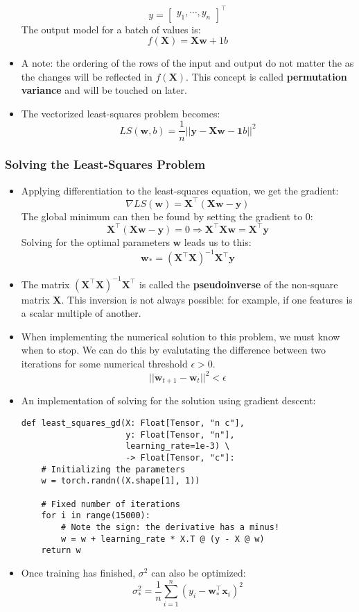 \documentclass{article}
\newcommand{\tbf}[1]{\textbf{#1}}
\newcommand{\mbf}[1]{\mathbf{#1}}
\begin{document}
\begin{itemize}
        \[
        y = 
        \begin{bmatrix}
            y_1, \cdots, y_n
        \end{bmatrix}
        ^{\top}
        \]
        The output model for a batch of values is:
        \[f(\mbf{X})=\mbf{Xw}+1b\] 
        \item A note: the ordering of the rows of the input and output do not matter the as the changes will be reflected in $f(\mbf{X})$. This concept is 
        called \tbf{permutation variance} and will be touched on later.
        \item The vectorized least-squares problem becomes:
        \[LS(\mbf{w},b)=\frac{1}{n}||\mbf{y}-\mbf{Xw}-\mbf{1}b||^2\]
    \end{itemize}
    \subsubsection{Solving the Least-Squares Problem}
    \begin{itemize}
        \item Applying differentiation to the least-squares equation, we get the gradient:
        \[\nabla LS(\mbf{w})=\mbf{X}^{\top}(\mbf{Xw-y})\]
        The global minimum can then be found by setting the gradient to 0:
        \[
            \mbf{X}^{\top}(\mbf{Xw-y}) = 0 \Rightarrow \mbf{X}^{\top}\mbf{Xw} = \mbf{X}^{\top}\mbf{y}
        \]
        Solving for the optimal parameters $\mbf{w}$ leads us to this:
        \[\mbf{w}_*=(\mbf{X}^{\top}\mbf{X})^{-1}\mbf{X^{\top}y}\]
        \item The matrix $\mbf{(X^{\top}X)}^{-1}\mbf{X^{\top}}$ is called the \tbf{pseudoinverse} of the non-square matrix $\mbf{X}$. This inversion is not 
        always possible: for example, if one features is a scalar multiple of another. 
        \item When implementing the numerical solution to this problem, we must know when to stop. We can do this by evalutating the difference between 
        two iterations for some numerical threshold $\epsilon > 0$. 
        \[||\mbf{w}_{t+1}-\mbf{w}_t||^2 < \epsilon\]
        \item An implementation of solving for the solution using gradient descent:
        \begin{lstlisting}
def least_squares_gd(X: Float[Tensor, "n c"],
                     y: Float[Tensor, "n"],
                     learning_rate=1e-3) \
                     -> Float[Tensor, "c"]:
    # Initializing the parameters
    w = torch.randn((X.shape[1], 1))
    
    # Fixed number of iterations
    for i in range(15000):
        # Note the sign: the derivative has a minus!
        w = w + learning_rate * X.T @ (y - X @ w)
    return w
        \end{lstlisting}
    \item Once training has finished, $\sigma ^2$ can also be optimized:
    \[\sigma_*^2 = \frac{1}{n}\sum^n_{i=1}(y_i-\mbf{w}_*^{\top}\mbf{x}_i)^2\]
    \end{itemize}
\end{document}
